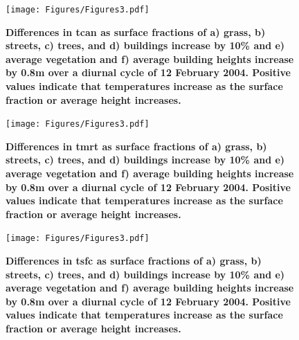 \documentclass[final,3p,times,authoryear]{elsarticle}
\begin{document}
%


\begin{figure}
\centering
\texttt{[image: Figures/Figures3.pdf]}
\caption{\bf Differences in \gls{tcan} as surface fractions of a) grass, b) streets, c) trees, and d) buildings increase by 10\% and e) average vegetation and f) average building heights increase by 0.8m over a diurnal cycle of 12 February 2004. Positive values indicate that temperatures increase as the surface fraction or average height increases. }
 \label{fig:r2parameterstcan}
\end{figure}

\begin{figure}
\centering
\texttt{[image: Figures/Figures3.pdf]}
\caption{\bf Differences in \gls{tmrt} as surface fractions of a) grass, b) streets, c) trees, and d) buildings increase by 10\% and e) average vegetation and f) average building heights increase by 0.8m over a diurnal cycle of 12 February 2004. Positive values indicate that temperatures increase as the surface fraction or average height increases. }
 \label{fig:r2parameterstmrt}
\end{figure}

\begin{figure}
\centering
\texttt{[image: Figures/Figures3.pdf]}
\caption{\bf Differences in \gls{tsfc} as surface fractions of a) grass, b) streets, c) trees, and d) buildings increase by 10\% and e) average vegetation and f) average building heights increase by 0.8m over a diurnal cycle of 12 February 2004. Positive values indicate that temperatures increase as the surface fraction or average height increases. }
 \label{fig:r2parameterstsfc}
\end{figure}
\end{document}
